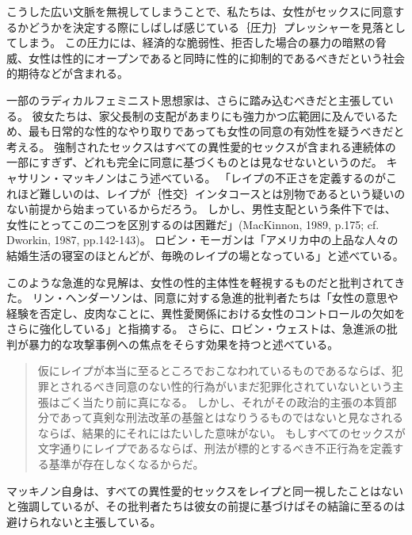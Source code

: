 \documentclass[paper=a4,book,openany]{jlreq}
\newcommand{\ig}[1]{}           %
\begin{document}
こうした広い文脈を無視してしまうことで、私たちは、女性がセックスに同意するかどうかを決定する際にしばしば感じている｛圧力｝{プレッシャー}を見落としてしまう。
この圧力には、経済的な脆弱性、拒否した場合の暴力の暗黙の脅威、女性は性的にオープンであると同時に性的に抑制的であるべきだという社会的期待などが含まれる。

一部のラディカルフェミニスト思想家は、さらに踏み込むべきだと主張している。
彼女たちは、家父長制の支配があまりにも強力かつ広範囲に及んでいるため、最も日常的な性的なやり取りであっても女性の同意の有効性を疑うべきだと考える。
強制されたセックスはすべての異性愛的セックスが含まれる連続体の一部にすぎず、どれも完全に同意に基づくものとは見なせないというのだ。
キャサリン・マッキノン\ig{Catharine MacKinnon}はこう述べている。
「レイプの不正さを定義するのがこれほど難しいのは、レイプが｛性交｝{インタコース}とは別物であるという疑いのない前提から始まっているからだろう。
しかし、男性支配という条件下では、女性にとってこの二つを区別するのは困難だ」(MacKinnon, 1989, p.175; cf. Dworkin, 1987, pp.142-143)。
\nocite{mackinnon89:_towar_femin_theor_of_state}\nocite{dworkin87:_inter}
ロビン・モーガン\ig{Robin Morgan}は「アメリカ中の上品な人々の結婚生活の寝室のほとんどが、毎晩のレイプの場となっている」と述べている\citep[pp.136-137]{morgan80:_theor_and_pract}。

このような急進的な見解は、女性の性的主体性を軽視するものだと批判されてきた。
リン・ヘンダーソン\ig{Lynne Henderson}は、同意に対する急進的批判者たちは「女性の意思や経験を否定し、皮肉なことに、異性愛関係における女性のコントロールの欠如をさらに強化している」と指摘する\citep[p.56]{henderson93:_gettin_know}。
さらに、ロビン・ウェスト\ig{Robin West}は、急進派の批判が暴力的な攻撃事例への焦点をそらす効果を持つと述べている。

\begin{quote}
仮にレイプが本当に至るところでおこなわれているものであるならば、犯罪とされるべき同意のない性的行為がいまだ犯罪化されていないという主張はごく当たり前に真になる。
しかし、それがその政治的主張の本質部分であって真剣な刑法改革の基盤とはなりうるものではないと見なされるならば、結果的にそれにはたいした意味がない。
もしすべてのセックスが文字通りにレイプであるならば、刑法が標的とするべき不正行為を定義する基準が存在しなくなるからだ。\citep{west10:_sex_law_consen}
\end{quote}

マッキノン自身は、すべての異性愛的セックスをレイプと同一視したことはないと強調しているが、その批判者たちは彼女の前提に基づけばその結論に至るのは避けられないと主張している。
\end{document}
